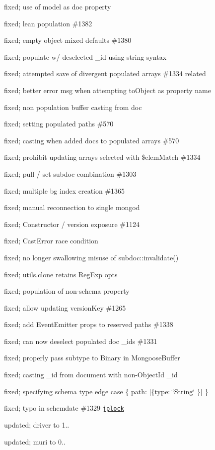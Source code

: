 \begin{DoxyItemize}
\item fixed; use of {\ttfamily model} as doc property
\item fixed; lean population \#1382
\item fixed; empty object mixed defaults \#1380
\item fixed; populate w/ deselected \+\_\+id using string syntax
\item fixed; attempted save of divergent populated arrays \#1334 related
\item fixed; better error msg when attempting to\+Object as property name
\item fixed; non population buffer casting from doc
\item fixed; setting populated paths \#570
\item fixed; casting when added docs to populated arrays \#570
\item fixed; prohibit updating arrays selected with \$elem\+Match \#1334
\item fixed; pull / set subdoc combination \#1303
\item fixed; multiple bg index creation \#1365
\item fixed; manual reconnection to single mongod
\item fixed; Constructor / version exposure \#1124
\item fixed; Cast\+Error race condition
\item fixed; no longer swallowing misuse of subdoc\+::invalidate()
\item fixed; utils.\+clone retains Reg\+Exp opts
\item fixed; population of non-\/schema property
\item fixed; allow updating version\+Key \#1265
\item fixed; add Event\+Emitter props to reserved paths \#1338
\item fixed; can now deselect populated doc \+\_\+ids \#1331
\item fixed; properly pass subtype to Binary in Mongoose\+Buffer
\item fixed; casting \+\_\+id from document with non-\/\+Object\+Id \+\_\+id
\item fixed; specifying schema type edge case \{ path\+: \mbox{[}\{type\+: \char`\"{}\+String\char`\"{} \}\mbox{]} \}
\item fixed; typo in schemdate \#1329 \href{https://github.com/jplock}{\tt jplock}
\item updated; driver to 1..
\item updated; muri to 0..

\end{DoxyItemize}
